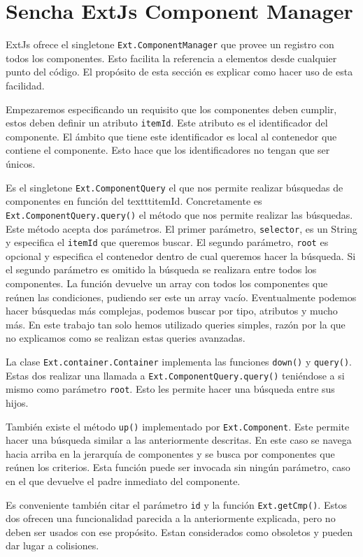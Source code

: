 \section{Sencha ExtJs Component Manager}
	ExtJs ofrece el singletone \texttt{Ext.ComponentManager} que provee un registro con todos los componentes. Esto facilita la referencia a
	elementos desde cualquier punto del código. El propósito de esta sección es explicar como hacer uso de esta facilidad.
	\par
	Empezaremos especificando un requisito que  los componentes deben cumplir, estos deben definir un atributo \texttt{itemId}. Este atributo es
	el identificador del componente. El ámbito que tiene este identificador es local al contenedor que contiene el componente. Esto hace que los
	identificadores no tengan que ser únicos. 
	\par
	Es el singletone \texttt{Ext.ComponentQuery} el que nos permite realizar búsquedas de componentes en función del texttt{itemId}. Concretamente
	es \texttt{Ext.ComponentQuery.query()} el método que nos permite realizar las búsquedas. Este método acepta dos parámetros. El primer
	parámetro, \texttt{selector}, es un String y especifica el \texttt{itemId} que queremos buscar. El segundo parámetro, \texttt{root} es
	opcional y especifica el contenedor dentro de cual queremos hacer la búsqueda. Si el segundo parámetro es omitido la búsqueda se realizara
	entre todos los componentes. La función devuelve un array con todos los componentes que reúnen las condiciones, pudiendo ser este un array
	vacío. Eventualmente podemos hacer búsquedas más complejas, podemos buscar por tipo, atributos y mucho más. En este trabajo tan solo hemos
	utilizado queries simples, razón por la que no explicamos como se realizan estas queries avanzadas.
	\par
	La clase \texttt{Ext.container.Container} implementa las funciones \texttt{down()} y \texttt{query()}. Estas dos realizar una llamada a
	\texttt{Ext.ComponentQuery.query()} teniéndose a si mismo como parámetro \texttt{root}. Esto les permite hacer una búsqueda entre sus hijos.
	\par
	También existe el método \texttt{up()} implementado por \texttt{Ext.Component}. Este permite hacer una búsqueda similar a las anteriormente
	descritas. En este caso se navega hacia arriba en la jerarquía de componentes y se busca por componentes que reúnen los criterios. Esta
	función puede ser invocada sin ningún parámetro, caso en el que devuelve el padre inmediato del componente.
	\par
	Es conveniente también citar el parámetro \texttt{id} y la función \texttt{Ext.getCmp()}. Estos dos ofrecen una funcionalidad parecida a la
	anteriormente explicada, pero no deben ser usados con ese propósito. Estan considerados como obsoletos y pueden dar lugar a colisiones. 


